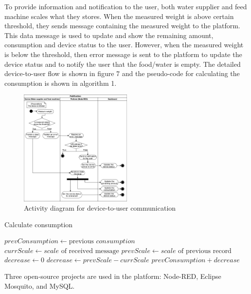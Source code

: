 \documentclass[conference]{IEEEtran}
\begin{document}
To provide information and notification to the user, both water supplier and feed machine scales what they stores. When the measured weight is above certain threshold, they sends message containing the measured weight to the platform. This data message is used to update and show the remaining amount, consumption and device status to the user. However, when the measured weight is below the threshold, then error message is sent to the platform to update the device status and to notify the user that the food/water is empty. The detailed device-to-user flow is shown in figure 7 and the pseudo-code for calculating the consumption is shown in algorithm 1.

\begin{figure}[htbp]
\centerline{\includegraphics[width=0.5\textwidth]{./images/device2user.png}}
\caption{Activity diagram for device-to-user communication}
\label{fig}
\end{figure}

\begin{algorithm}
\caption{Calculate consumption}\label{algo}
\begin{algorithmic}[1]
        \State $prevConsumption \gets \text{previous } \textit{consumption}$
        \State $currScale \gets \textit{scale} \text{ of received message}$
        \State $prevScale \gets \textit{scale} \text{ of  previous record}$
        \State $decrease \gets 0$
            \State $decrease \gets prevScale - currScale$
        \EndIf
        \Return $prevConsumption + decrease$
    \EndProcedure
\end{algorithmic}
\end{algorithm}

Three open-source projects are used in the platform: Node-RED, Eclipse Mosquito, and MySQL.
\end{document}

